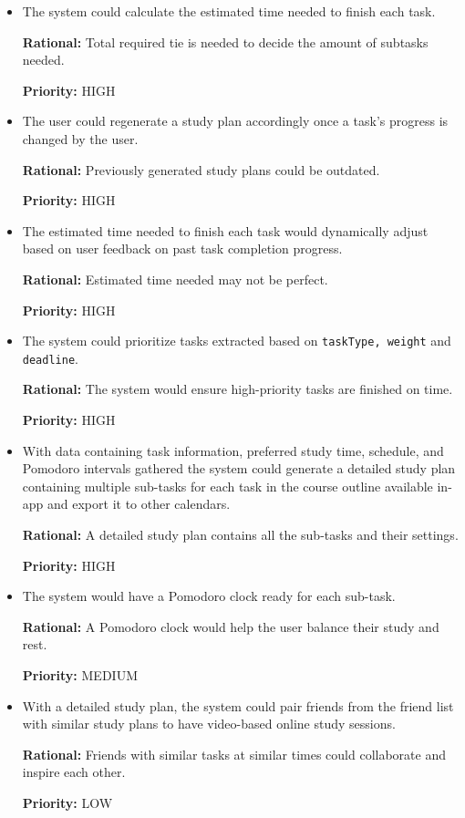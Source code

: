 \documentclass[12pt]{article}
\newcounter{reqnum} %
\newcommand{\rthereqnum}{FR\refstepcounter{reqnum}\thereqnum:}
\begin{document}
\begin{itemize}
\item[\rthereqnum]
The system could calculate the estimated time needed to finish each task. 

\textbf{Rational:} Total required tie is needed to decide the amount of subtasks needed.

\textbf{Priority:} HIGH
\item[\rthereqnum]
The user could regenerate a study plan accordingly once a task's progress is changed by the user.

\textbf{Rational:} Previously generated study plans could be outdated.

\textbf{Priority:} HIGH
\item[\rthereqnum]
The estimated time needed to finish each task would dynamically adjust based on user feedback on past task completion progress.

\textbf{Rational:} Estimated time needed may not be perfect.

\textbf{Priority:} HIGH
\item[\rthereqnum]
The system could prioritize tasks extracted based on \texttt{taskType, weight} and \texttt{deadline}.

\textbf{Rational:} The system would ensure high-priority tasks are finished on time.

\textbf{Priority:} HIGH
\item[\rthereqnum]
With data containing task information, preferred study time, schedule, and Pomodoro intervals gathered the system could generate a detailed study plan containing multiple sub-tasks for each task in the course outline available in-app and export it to other calendars.

\textbf{Rational:} A detailed study plan contains all the sub-tasks and their settings.

\textbf{Priority:} HIGH
\item[\rthereqnum]
The system would have a Pomodoro clock ready for each sub-task.

\textbf{Rational:} A Pomodoro clock would help the user balance their study and rest.

\textbf{Priority:} MEDIUM
\item[\rthereqnum]
With a detailed study plan, the system could pair friends from the friend list with similar study plans to have video-based online study sessions.

\textbf{Rational:} Friends with similar tasks at similar times could collaborate and inspire each other.

\textbf{Priority:} LOW
\end{itemize}
\end{document}
